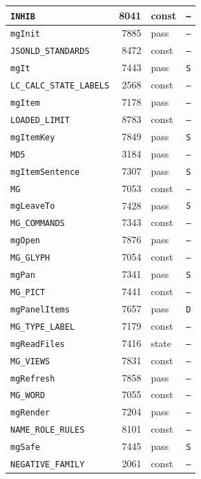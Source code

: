 {\begin{xltabular}{\linewidth}{|l|r|X|X|}
\texttt{INHIB} & 8041 & const & \texttt{--} \\ \hline
\texttt{mgInit} & 7885 & pass & \texttt{--} \\ \hline
\texttt{JSONLD\_STANDARDS} & 8472 & const & \texttt{--} \\ \hline
\texttt{mgIt} & 7443 & pass & \texttt{S} \\ \hline
\texttt{LC\_CALC\_STATE\_LABELS} & 2568 & const & \texttt{--} \\ \hline
\texttt{mgItem} & 7178 & pass & \texttt{--} \\ \hline
\texttt{LOADED\_LIMIT} & 8783 & const & \texttt{--} \\ \hline
\texttt{mgItemKey} & 7849 & pass & \texttt{S} \\ \hline
\texttt{MD5} & 3184 & pass & \texttt{--} \\ \hline
\texttt{mgItemSentence} & 7307 & pass & \texttt{S} \\ \hline
\texttt{MG} & 7053 & const & \texttt{--} \\ \hline
\texttt{mgLeaveTo} & 7428 & pass & \texttt{S} \\ \hline
\texttt{MG\_COMMANDS} & 7343 & const & \texttt{--} \\ \hline
\texttt{mgOpen} & 7876 & pass & \texttt{--} \\ \hline
\texttt{MG\_GLYPH} & 7054 & const & \texttt{--} \\ \hline
\texttt{mgPan} & 7341 & pass & \texttt{S} \\ \hline
\texttt{MG\_PICT} & 7441 & const & \texttt{--} \\ \hline
\texttt{mgPanelItems} & 7657 & pass & \texttt{D} \\ \hline
\texttt{MG\_TYPE\_LABEL} & 7179 & const & \texttt{--} \\ \hline
\texttt{mgReadFiles} & 7416 & state & \texttt{--} \\ \hline
\texttt{MG\_VIEWS} & 7831 & const & \texttt{--} \\ \hline
\texttt{mgRefresh} & 7858 & pass & \texttt{--} \\ \hline
\texttt{MG\_WORD} & 7055 & const & \texttt{--} \\ \hline
\texttt{mgRender} & 7204 & pass & \texttt{--} \\ \hline
\texttt{NAME\_ROLE\_RULES} & 8101 & const & \texttt{--} \\ \hline
\texttt{mgSafe} & 7445 & pass & \texttt{S} \\ \hline
\texttt{NEGATIVE\_FAMILY} & 2061 & const & \texttt{--} \\ \hline

\end{xltabular}}
